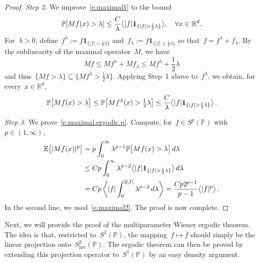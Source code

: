 \documentclass[11pt,twoside]{article} %
\numberwithin{equation}{section}
\theoremstyle{definition}
\let\originalleft\left
\let\originalright\right
\renewcommand{\left}{\mathopen{}\mathclose\bgroup\originalleft}
\renewcommand{\right}{\aftergroup\egroup\originalright}
\newcommand*{\Rd}{\ensuremath{\mathbb{R}^d}}
\newcommand{\inv}{\mathrm{inv}}
\renewcommand{\P}{\mathbb{P}}
\newcommand{\E}{\mathbb{E}}
\newcommand{\indc}{\boldsymbol{1}}
\begin{document}
\begin{proof}
\smallskip

\emph{Step 2.} We improve~\eqref{e.maximal1} to the bound
\begin{equation}
\label{e.maximal2}
\P \left[ Mf(x) > \lambda \right] 
\leq 
\frac{C}{\lambda} \bigl\langle \left| f \right| \indc_{\{ |f| > \frac12\lambda \} } \bigr\rangle, \quad \forall x\in \Rd.
\end{equation}
For~$\lambda>0$, define~$f^\lambda:= f \indc_{\{ |f| > \frac12\lambda\}}$ and~$f_\lambda := f \indc_{\{ |f| \leq \frac12\lambda\}}$ so that~$f= f^\lambda+f_\lambda$. 
By the sublinearity of the maximal operator~$M$, we have 
\begin{equation*}
Mf 
\leq M f^\lambda + Mf_\lambda
\leq Mf^\lambda + \frac12\lambda
\end{equation*}
and thus~$\{ Mf > \lambda \} \subseteq \{ M f^\lambda > \frac12\lambda\}$. Applying Step~1 above to~$f^{\lambda}$, we obtain, for every~$x\in\Rd$, 
\begin{equation*}
\P \bigl[ Mf(x) > \lambda \bigr]
\leq 
\P \bigl[ Mf^{\lambda} (x) > \tfrac12\lambda \bigr]
\leq
\frac{C}{\lambda} \bigl\langle \left| f \right| \indc_{\{ |f| > \frac12\lambda \} } \bigr\rangle\,.
\end{equation*}

\emph{Step 3.} We prove~\eqref{e.maximal.ergodic.p}.
Compute, for~$f\in S^p(\P)$ with~$p\in (1,\infty)$, 
\begin{align*}
\E \bigl[ |Mf(x)|^p \bigr]
&
=
p\int_0^\infty\lambda^{p-1} \P \bigl[ Mf(x) >\lambda \bigr] \,d\lambda
\\ & 
\leq
Cp
\int_0^\infty \lambda^{p-2}
\bigl\langle \left| f \right| \indc_{\{ |f| > \frac12\lambda \} } \bigr\rangle \, d\lambda
\\ & 
= 
Cp \,
\biggl\langle
|f| 
\int_0^{2|f|} \lambda^{p-2} \,d\lambda
\biggr\rangle
=
\frac{Cp 2^{p-1}}{p-1}
\bigl\langle |f|^p \bigr\rangle\,.
\end{align*}
In the second line, we used~\eqref{e.maximal2}. 
The proof is now complete. 
\end{proof}

Next, we will provide the proof of the multiparameter Wiener ergodic theorem. The idea is that, restricted to~$S^2(\P)$, the mapping~$f\mapsto \overline{f}$ should simply be the linear projection onto~$S^2_\inv(\P)$. The ergodic theorem can then be proved by extending this projection operator to~$S^1(\P)$ by an easy density argument. 
\end{document}
